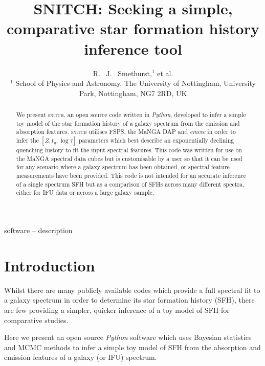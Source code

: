 \documentclass[useAMS,usenatbib]{mn2e}
\begin{document}
\title[\textsc{snitch}: inferring quenching histories]{SNITCH: Seeking a simple, comparative star formation history inference tool}
\author[Smethurst et al. 2018]{R. ~J. ~Smethurst,$^{1}$  et al.
\\ $^1$ School of Physics and Astronomy, The University of Nottingham, University Park, Nottingham, NG7 2RD, UK
}

\maketitle

\begin{abstract}
We present \textsc{snitch}, an open source code written in \emph{Python}, developed to infer a simple toy model of the star formation history of a galaxy spectrum from the emission and absorption features. \textsc{snitch} utilises FSPS, the MaNGA DAP and \emph{emcee} in order to infer the $[Z, t_q, \log \tau]$ parameters which best  describe an exponentially declining quenching history to fit the input spectral features. This code was written for use on the MaNGA spectral data cubes but is customisable by a user so that it can be used for any scenario where a galaxy spectrum has been obtained, or spectral feature measurements have been provided. This code is not intended for an accurate inference of a single spectrum SFH but as a comparison of SFHs across many different spectra, either for IFU data or across a large galaxy sample.
\end{abstract}

\begin{keywords}
software -- description
\end{keywords}

\section{Introduction}

Whilst there are many publicly available codes which provide a full spectral fit to a galaxy spectrum in order to determine its star formation history (SFH), there are few providing a simpler, quicker inference of a toy model of SFH for comparative studies. 

Here we present an open source \emph{Python} software which uses Bayesian statistics and MCMC methods to infer a simple toy model of SFH from the absorption and emission features of a galaxy (or IFU) spectrum. 
\end{document}

